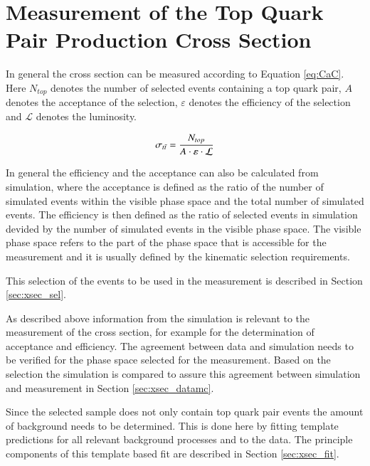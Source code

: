 \chapter{Measurement of the Top Quark Pair Production Cross Section}

In general the cross section can be measured according to Equation \ref{eq:CaC}. Here $N_{top}$ denotes the number of selected events containing a top quark pair, $A$ denotes the acceptance of the selection,
$\varepsilon$ denotes the efficiency of the selection and $\mathcal{L}$ denotes the luminosity.


\begin{equation}
\sigma_{t\bar{t}} = \frac{N_{top}}{A \cdot \varepsilon \cdot \mathcal{L}}
\label{eq:CaC}
\end{equation} 

In general the efficiency and the acceptance can also be calculated from simulation, where
the acceptance is defined as the ratio of the number of simulated \ttbar events within the visible phase space and the total number of simulated \ttbar events.
The efficiency is then defined as the ratio of selected \ttbar events in simulation devided by the number of simulated \ttbar events in the visible phase space.
The visible phase space refers to the part of the phase space that is accessible for the measurement and it is usually defined by the kinematic selection requirements.

This selection of the events to be used in the measurement is described in Section \ref{sec:xsec_sel}.

As described above information from the simulation is relevant to the measurement of the \ttbar cross section, for example for the determination of acceptance and efficiency.
The agreement between data and simulation needs to be verified for the phase space selected for the measurement.
Based on the selection the simulation is compared to assure this agreement between simulation and measurement in Section \ref{sec:xsec_datamc}.

Since the selected sample does not only contain top quark pair events the amount of background needs to be determined.
This is done here by fitting template predictions for all relevant background processes and \ttbar to the data.
The principle components of this template based fit are described in Section \ref{sec:xsec_fit}.

